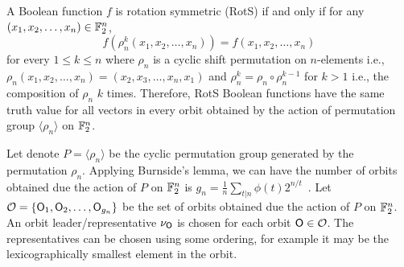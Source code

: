\documentclass{llncs}
\begin{document}
\iffalse
\begin{definition}\label{def:RSF}
A Boolean function $f$ is rotation symmetric (RotS) if and only if for any $(x_1,x_2,\ldots,x_n)\in \mathbb{F}_2^n$,
$$f(\rho_n^k(x_1,x_2,\ldots,x_n))= f(x_1,x_2,\ldots,x_n) $$ for every $1 \leq k \leq n$ where $\rho_n$ is a cyclic shift permutation on $n$-elements i.e., $\rho_n(x_1,x_2,\ldots,x_n) = (x_2,x_3,\ldots,x_{n},x_1)$ and $\rho_n^k = \rho_n \circ \rho_n^{k-1}$ for $k > 1$ i.e., the composition of $\rho_n$ $k$ times.%
Therefore, RotS Boolean functions have the same truth value for all vectors in every orbit obtained by the action of permutation group $\langle \rho_n \rangle$ on $\mathbb{F}_2^n$. 
\end{definition}

Let denote $P = \langle \rho_n \rangle$ be the cyclic permutation group generated by the permutation $\rho_n$. Applying Burnside's lemma, we can have the number of orbits obtained due the action of $P$ on $\mathbb{F}_2^n$ is $g_n = \frac{1}{n}\sum_{t \vert n} \phi(t) 2^{n/t}$~\cite{DAM:SM08}. Let $\mathcal{O} = \{\mathsf{O}_1, \mathsf{O}_2,\ldots, \mathsf{O}_{g_n}\}$ be the set of orbits obtained due the action of $P$ on $\mathbb{F}_2^n$. An orbit leader/representative $\nu_{\mathsf{O}}$ is chosen for each orbit $\mathsf{O} \in \mathcal{O}$. The representatives can be chosen using some ordering, for example it may be the lexicographically smallest element in the orbit.
\end{document}
